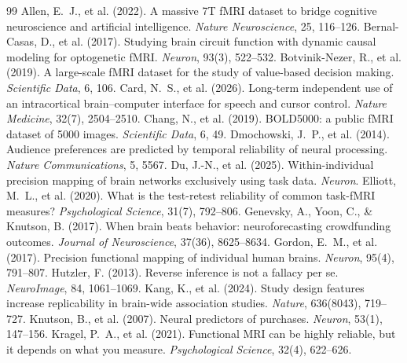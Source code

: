 \documentclass{article}
\begin{document}

\begin{thebibliography}{99}\small
{} Allen, E.~J., et al. (2022). A massive 7T fMRI dataset to bridge cognitive neuroscience and artificial intelligence. \emph{Nature Neuroscience}, 25, 116--126.
 Bernal-Casas, D., et al. (2017). Studying brain circuit function with dynamic causal modeling for optogenetic fMRI. \emph{Neuron}, 93(3), 522--532.
 Botvinik-Nezer, R., et al. (2019). A large-scale fMRI dataset for the study of value-based decision making. \emph{Scientific Data}, 6, 106.
 Card, N.~S., et al. (2026). Long-term independent use of an intracortical brain--computer interface for speech and cursor control. \emph{Nature Medicine}, 32(7), 2504--2510.
 Chang, N., et al. (2019). BOLD5000: a public fMRI dataset of 5000 images. \emph{Scientific Data}, 6, 49.
 Dmochowski, J.~P., et al. (2014). Audience preferences are predicted by temporal reliability of neural processing. \emph{Nature Communications}, 5, 5567.
 Du, J.-N., et al. (2025). Within-individual precision mapping of brain networks exclusively using task data. \emph{Neuron}.
 Elliott, M.~L., et al. (2020). What is the test-retest reliability of common task-fMRI measures? \emph{Psychological Science}, 31(7), 792--806.
 Genevsky, A., Yoon, C., \& Knutson, B. (2017). When brain beats behavior: neuroforecasting crowdfunding outcomes. \emph{Journal of Neuroscience}, 37(36), 8625--8634.
 Gordon, E.~M., et al. (2017). Precision functional mapping of individual human brains. \emph{Neuron}, 95(4), 791--807.
 Hutzler, F. (2013). Reverse inference is not a fallacy per se. \emph{NeuroImage}, 84, 1061--1069.
 Kang, K., et al. (2024). Study design features increase replicability in brain-wide association studies. \emph{Nature}, 636(8043), 719--727.
 Knutson, B., et al. (2007). Neural predictors of purchases. \emph{Neuron}, 53(1), 147--156.
 Kragel, P.~A., et al. (2021). Functional MRI can be highly reliable, but it depends on what you measure. \emph{Psychological Science}, 32(4), 622--626.

\end{thebibliography}
\end{document}
